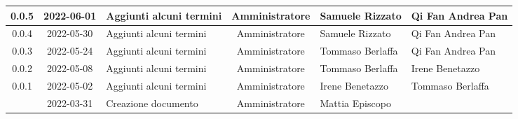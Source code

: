 \begin{center}
\begin{longtable}{ |c|c|p{8em}|c|m{5em}|m{6em}| }
	\hline
	0.0.5 & 2022-06-01 & Aggiunti alcuni termini & Amministratore & Samuele \newline Rizzato &Qi Fan \newline Andrea Pan \\
	\hline
	0.0.4 & 2022-05-30 & Aggiunti alcuni termini & Amministratore & Samuele \newline Rizzato & Qi Fan \newline Andrea Pan\\
	\hline
	0.0.3 & 2022-05-24 & Aggiunti alcuni termini & Amministratore & Tommaso \newline Berlaffa & Qi Fan \newline Andrea Pan\\
	\hline
	0.0.2 & 2022-05-08 & Aggiunti alcuni termini & Amministratore & Tommaso \newline Berlaffa & Irene \newline Benetazzo\\
	\hline
	0.0.1 & 2022-05-02 & Aggiunti alcuni termini & Amministratore & Irene \newline Benetazzo & Tommaso \newline Berlaffa\\
	\hline
  	& 2022-03-31 & Creazione documento & Amministratore & Mattia \newline Episcopo & \\ 
	\hline
	\end{longtable}
	\end{center}
	\newpage